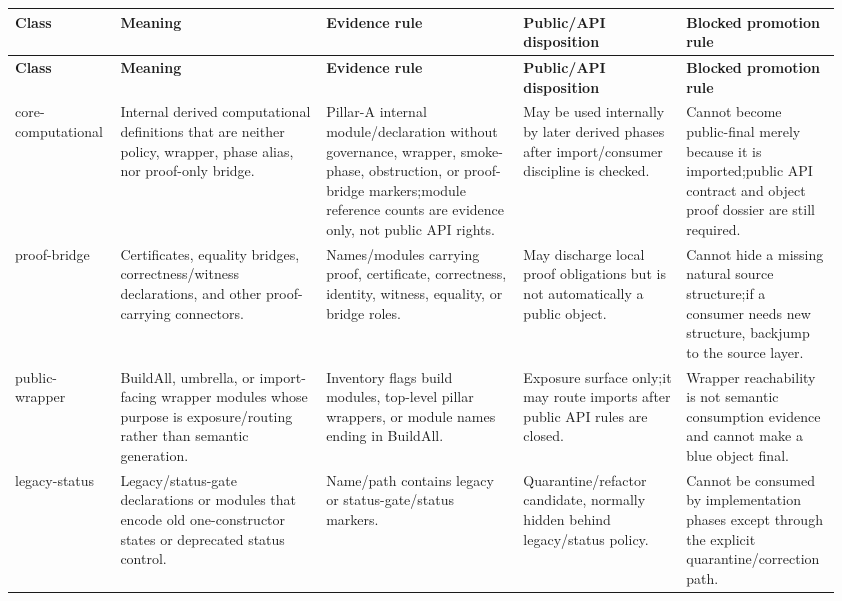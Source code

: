 \footnotesize
{}
\begin{longtable}{L{0.115\linewidth} L{0.245\linewidth} L{0.23\linewidth} L{0.19\linewidth} L{0.18\linewidth}}
\hline
\textbf{Class} & \textbf{Meaning} & \textbf{Evidence rule} & \textbf{Public/\allowbreak{}API disposition} & \textbf{Blocked promotion rule}\\
\hline
\endfirsthead
\hline
\textbf{Class} & \textbf{Meaning} & \textbf{Evidence rule} & \textbf{Public/\allowbreak{}API disposition} & \textbf{Blocked promotion rule}\\
\hline
\endhead
core-computational & Internal derived computational definitions that are neither policy, wrapper, phase alias, nor proof-only bridge. & Pillar-A internal module/\allowbreak{}declaration without governance, wrapper, smoke-phase, obstruction, or proof-bridge markers;\newline module reference counts are evidence only, not public API rights. & May be used internally by later derived phases after import/\allowbreak{}consumer discipline is checked. & Cannot become public-final merely because it is imported;\newline public API contract and object proof dossier are still required.\\
\hline
\addlinespace[0.24em]
proof-bridge & Certificates, equality bridges, correctness/\allowbreak{}witness declarations, and other proof-carrying connectors. & Names/\allowbreak{}modules carrying proof, certificate, correctness, identity, witness, equality, or bridge roles. & May discharge local proof obligations but is not automatically a public object. & Cannot hide a missing natural source structure;\newline if a consumer needs new structure, backjump to the source layer.\\
\hline
\addlinespace[0.24em]
public-wrapper & BuildAll, umbrella, or import-facing wrapper modules whose purpose is exposure/\allowbreak{}routing rather than semantic generation. & Inventory flags build modules, top-level pillar wrappers, or module names ending in BuildAll. & Exposure surface only;\newline it may route imports after public API rules are closed. & Wrapper reachability is not semantic consumption evidence and cannot make a blue object final.\\
\hline
\addlinespace[0.24em]
legacy-status & Legacy/\allowbreak{}status-gate declarations or modules that encode old one-constructor states or deprecated status control. & Name/\allowbreak{}path contains legacy or status-gate/\allowbreak{}status markers. & Quarantine/\allowbreak{}refactor candidate, normally hidden behind legacy/\allowbreak{}status policy. & Cannot be consumed by implementation phases except through the explicit quarantine/\allowbreak{}correction path.\\

\end{longtable}

